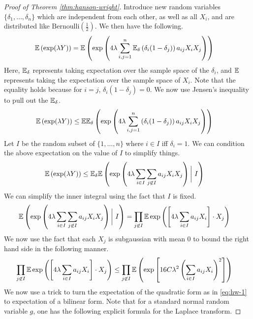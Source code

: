 \documentclass[11pt]{article}
\begin{document}
\begin{proof}[Proof of Theorem \ref{thm:hanson-wright}]
  Introduce new random variables $\{\delta_1, \ldots, \delta_n\}$ which are independent from each other, as well as all $X_i$, and are distributed like $\mathrm{Bernoulli}\left( \frac{1}{2} \right)$. We then have the following.
  \begin{align*}
    \mathbb{E}\left( \exp(\lambda Y) \right)
    &= \mathbb{E}\left(  \exp\left( 4\lambda \sum_{i,j = 1}^{n} \mathbb{E}_{\delta}\left( \delta_i(1- \delta_j) \right) a_{ij} X_i X_{j} \right) \right)
  \end{align*}
  Here, $\mathbb{E}_{\delta}$ represents taking expectation over the sample space of the $\delta_{i}$, and $\mathbb{E}$ represents taking the expectation over the sample space of $X_i$.
  Note that the equality holds because for $i=j$, $\delta_i(1-\delta_j) = 0$.
  We now use Jensen's inequality to pull out the $\mathbb{E}_{\delta}$.
  \begin{align*}
    \mathbb{E}\left( \exp(\lambda Y) \right)
    &\leq \mathbb{E} \mathbb{E}_{\delta}\left(  \exp\left( 4\lambda \sum_{i,j = 1}^{n} \left( \delta_i(1- \delta_j) \right) a_{ij} X_i X_{j} \right) \right)
  \end{align*}
  Let $I$ be the random subset of $\{1, \ldots, n\}$ where $i \in I$ iff $\delta_i = 1$.
  We can condition the above expectation on the value of $I$ to simplify things.
  \begin{align*}
    \mathbb{E}\left( \exp(\lambda Y) \right)
    &\leq \mathbb{E}_{\delta} \mathbb{E} \left( \exp\left( 4\lambda \sum_{i \in I} \sum_{j \not \in I} a_{ij} X_i X_j \right) \bigg|\ I \right)
  \end{align*}
  We can simplify the inner integral using the fact that $I$ is fixed.
  \begin{align*}
    \mathbb{E} \left( \exp\left( 4\lambda \sum_{i \in I} \sum_{j \not \in I} a_{ij} X_i X_j \right) \bigg|\ I \right)
    &= \prod_{j \not \in I} \mathbb{E} \exp\left( \left[ 4 \lambda \sum_{i \in I} a_{ij} X_i \right] \cdot X_j \right)
  \end{align*}
  We now use the fact that each $X_j$ is subgaussian with mean $0$ to bound the right hand side in the following manner.
  \begin{align}
    \label{eq:hw-1}
    \prod_{j \not \in I} \mathbb{E} \exp\left( \left[ 4 \lambda \sum_{i \in I} a_{ij} X_i \right] \cdot X_j \right)
    &\leq \prod_{j \not \in I} \mathbb{E} \left( \exp\left[ 16 C \lambda^2 \left( \sum_{i \in I} a_{ij} X_i \right)^2 \right] \right)
  \end{align}
  We now use a trick to turn the expectation of the quadratic form as in \eqref{eq:hw-1} to expectation of a bilinear form.
  Note that for a standard normal random variable $g$, one has the following explicit formula for the Laplace transform.

\end{proof}
\end{document}
